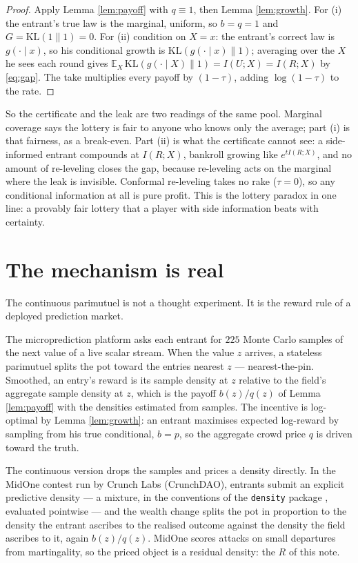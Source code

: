 \documentclass[11pt]{article}
\begin{document}
\begin{proof}
Apply Lemma \ref{lem:payoff} with $q\equiv 1$, then Lemma \ref{lem:growth}. For (i) the entrant's
true law is the marginal, uniform, so $b=q=1$ and $G=\mathrm{KL}(1\|1)=0$. For (ii) condition on
$X=x$: the entrant's correct law is $g(\cdot\mid x)$, so his conditional growth is
$\mathrm{KL}(g(\cdot\mid x)\|1)$; averaging over the $X$ he sees each round gives
$\mathbb E_X\,\mathrm{KL}(g(\cdot\mid X)\|1)=I(U;X)=I(R;X)$ by \eqref{eq:gap}. The take multiplies
every payoff by $(1-\tau)$, adding $\log(1-\tau)$ to the rate.
\end{proof}

So the certificate and the leak are two readings of the same pool. Marginal coverage says the
lottery is fair to anyone who knows only the average; part (i) is that fairness, as a break-even.
Part (ii) is what the certificate cannot see: a side-informed entrant compounds at $I(R;X)$,
bankroll growing like $e^{tI(R;X)}$, and no amount of re-leveling closes the gap, because re-leveling
acts on the marginal where the leak is invisible. Conformal re-leveling takes no rake ($\tau=0$), so
any conditional information at all is pure profit. This is the lottery paradox in one line: a
provably fair lottery that a player with side information beats with certainty.

\section{The mechanism is real}

The continuous parimutuel is not a thought experiment. It is the reward rule of a deployed
prediction market.

The microprediction platform \citep{cotton_micro2022} asks each entrant for $225$ Monte Carlo
samples of the next value of a live scalar stream. When the value $z$ arrives, a stateless
parimutuel splits the pot toward the entries nearest $z$ --- nearest-the-pin. Smoothed, an entry's
reward is its sample density at $z$ relative to the field's aggregate sample density at $z$, which
is the payoff $b(z)/q(z)$ of Lemma \ref{lem:payoff} with the densities estimated from samples. The
incentive is log-optimal by Lemma \ref{lem:growth}: an entrant maximises expected log-reward by
sampling from his true conditional, $b=p$, so the aggregate crowd price $q$ is driven toward the
truth.

The continuous version drops the samples and prices a density directly. In the MidOne contest run by
Crunch Labs (CrunchDAO), entrants submit an explicit predictive density --- a mixture, in the
conventions of the \texttt{density} package \citep{micro_density}, evaluated pointwise --- and the
wealth change splits the pot in proportion to the density the entrant ascribes to the realised
outcome against the density the field ascribes to it, again $b(z)/q(z)$. MidOne scores attacks on
small departures from martingality, so the priced object is a residual density: the $R$ of this
note.
\end{document}
